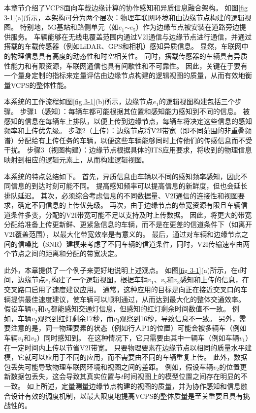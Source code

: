 本章节介绍了VCPS面向车载边缘计算的协作感知和异质信息融合架构。
如图\ref{fig 3-1}(a)所示，本架构可分为两个层次：物理车联网环境和由边缘节点构建的逻辑视图。
特别地，5G基站和路侧单元（如$e_1$$\sim$$e_5$）作为边缘节点被安装在道路旁边提供服务。
车辆能够在无线电覆盖范围内通过V2I通信与边缘节点进行通信，并通过搭载的车载传感器（例如LiDAR、GPS和相机）感知异质信息。
显然，车联网中的物理信息具有高度的动态性和时空相关性。
同时，搭载传感器的车辆具有异质性能力和有限资源，车联网通信也具有间歇性和不可靠性。
因此，关键在于要有一个量身定制的指标来定量评估由边缘节点构建的逻辑视图的质量，从而有效地衡量VCPS的整体性能。

本系统的工作流程如图\ref{fig 3-1}(b)所示，边缘节点$e_1$的逻辑视图构建包括三个步骤。
步骤1（感知）：每辆车都可能根据其位置和感知能力感知到不同的信息。
被感知的信息在每辆车上排队，以便上传到边缘节点，每辆车将决定这些信息的感知频率和上传优先级。
步骤2（上传）：边缘节点将V2I带宽（即不同范围的非重叠频谱）分配给有上传任务的车辆，以便这些车辆能够同时上传他们的传感信息而不受干扰。
步骤3（视图构建）：边缘节点根据具体的ITS应用要求，将收到的物理信息映射到相应的逻辑元素上，从而构建逻辑视图。

本系统的特点总结如下。
首先，异质信息由车辆以不同的感知频率感知，因此不同信息的到达时刻可能不同。
提高感知频率可以提高信息的新鲜度，但也会延长排队延迟。
其次，必须综合考虑信息的不同数据量、V2I通信的连接性和视图要求，确定不同信息的上传优先级。
再次，由于边缘节点的带宽资源有限且车辆信道条件多变，分配的V2I带宽可能不足以支持及时上传数据。
因此，将更大的带宽分配给准备上传更新鲜、更紧急信息的车辆，而不是在更差的信道条件下（如离开V2I覆盖范围），以最大化带宽效率是有意义的。
最后，通过对车辆和边缘节点之间的信噪比（SNR）建模来考虑了不同车辆的信道条件，同时，V2I传输速率由两个节点之间的距离和分配的带宽决定。

此外，本章提供了一个例子来更好地说明上述观点。
如图\ref{fig 3-1}(a)所示，在$t$时间，边缘节点$e_1$构建了一个逻辑视图，根据车辆$v_1$、$v_2$和$v_3$感知和上传的信息，在交叉路口启用了速度建议应用。
通常，这种应用的目标是向正在接近交叉口的车辆提供最佳速度建议，使车辆可以顺利通过，从而达到最大化的整体交通效率。
假设车辆$v_2$和$v_3$都能感知交通灯信息，但感知的红灯剩余时间数值不一致。
例如，车辆$v_2$观察到红灯剩余17秒，而$v_3$观察到16秒，导致信息不一致。
另外，需要注意的是，同一物理要素的状态（例如行人P1的位置）可能会被多辆车（例如车辆$v_1$和$v_2$）同时感知到。
在这种情况下，它只需要由其中一辆车（例如车辆$v_1$）在一定时间内上传以节省V2I带宽。
只要物理要素在边缘节点以相同的质量水平建模，它就可以应用于不同的应用，而不需要由不同的车辆重复上传。
此外，数据包丢失可能导致物理车联网环境和视图之间的差距。
例如，假设车辆$v_2$的位置更新数据包丢失，这会导致其真实位置与$t$时间视图上的模型位置之间存在明显的不一致。
如上所述，定量测量边缘节点构建的视图的质量，并为协作感知和信息融合设计有效的调度机制，以最大限度地提高VCPS的整体质量是至关重要且具有挑战性的。

